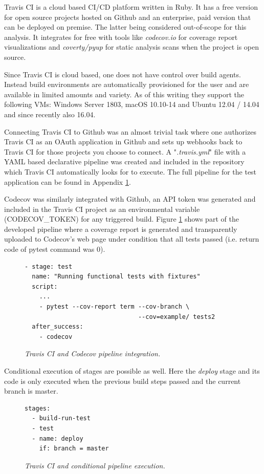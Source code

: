 Travis CI is a cloud based CI/CD platform written in Ruby. It has a free version for open source projects hosted on Github and an enterprise, paid version that can be deployed on premise. The latter being considered out-of-scope for this analysis. It integrates for free with tools like \textit{codecov.io} for coverage report visualizations and \textit{coverty/pyup} for static analysis scans when the project is open source.\cite{pyup}

Since Travis CI is cloud based, one does not have control over build agents. Instead build environments are automatically provisioned for the user and are available in limited amounts and variety. As of this writing they support the following VMs: Windows Server 1803, macOS 10.10-14 and Ubuntu 12.04 / 14.04 and since recently also 16.04. 

Connecting Travis CI to Github was an almost trivial task where one authorizes Travis CI as an OAuth application in Github and sets up webhooks back to Travis CI for those projects you choose to connect. A "\textit{.travis.yml}" file with a YAML based declarative pipeline was created and included in the repository which Travis CI automatically looks for to execute. The full pipeline for the test application can be found in Appendix \hyperref[chapter:appendix-travis]{1}. 

Codecov was similarly integrated with Github, an API token was generated and included in the Travis CI project as an environmental variable (CODECOV\_TOKEN) for any triggered build. Figure \ref{fig:travis-codecov} shows part of the developed pipeline where a coverage report is generated and transparently uploaded to Codecov's web page under condition that all tests passed (i.e. return code of pytest command was 0).
\begin{figure}[H]
\centering
\begin{lstlisting}[frame=single, basicstyle=\small, linewidth=\textwidth]
- stage: test
  name: "Running functional tests with fixtures"
  script:
    ...
    - pytest --cov-report term --cov-branch \
                               --cov=example/ tests2
  after_success:
    - codecov
\end{lstlisting}
\caption{\textit{Travis CI and Codecov pipeline integration.}}
\label{fig:travis-codecov}
\end{figure}

Conditional execution of stages are possible as well. Here the \textit{deploy} stage and its code is only executed when the previous build steps passed and the current branch is master.
\begin{figure}[H]
\centering
\begin{lstlisting}[frame=single, basicstyle=\small, linewidth=\textwidth]
stages:
  - build-run-test
  - test
  - name: deploy
    if: branch = master
\end{lstlisting}
\caption{\textit{Travis CI and conditional pipeline execution.}}
\label{fig:travis-conditional}
\end{figure}

